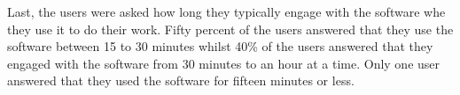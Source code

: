 


Last, the users were asked how long they typically engage with the software whe they use it to do their work. Fifty percent of the users answered that they use the software between 15 to 30 minutes whilst 40\% of the users answered that they engaged with the software from 30 minutes to an hour at a time. Only one user answered that they used the software for fifteen minutes or less.




